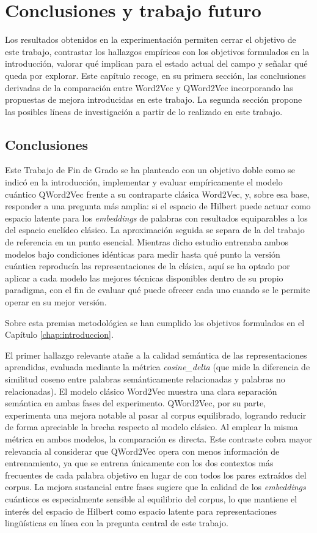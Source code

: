 \chapter{Conclusiones y trabajo futuro}
\label{chap:conclusiones}

Los resultados obtenidos en la experimentación permiten cerrar el objetivo de este trabajo, contrastar los hallazgos empíricos con los objetivos formulados en la introducción, valorar qué implican para el estado actual del campo y señalar qué queda por explorar. Este capítulo recoge, en su primera sección, las conclusiones derivadas de la comparación entre Word2Vec y QWord2Vec incorporando las propuestas de mejora introducidas en este trabajo. La segunda sección propone las posibles líneas de investigación a partir de lo realizado en este trabajo.

\section{Conclusiones}

Este Trabajo de Fin de Grado se ha planteado con un objetivo doble como se indicó en la introducción, implementar y evaluar empíricamente el modelo cuántico QWord2Vec frente a su contraparte clásica Word2Vec, y, sobre esa base, responder a una pregunta más amplia: si el espacio de Hilbert puede actuar como espacio latente para los \textit{embeddings} de palabras con resultados equiparables a los del espacio euclídeo clásico. La aproximación seguida se separa de la del trabajo de referencia \cite{ohno_qword2vec_2025} en un punto esencial. Mientras dicho estudio entrenaba ambos modelos bajo condiciones idénticas para medir hasta qué punto la versión cuántica reproducía las representaciones de la clásica, aquí se ha optado por aplicar a cada modelo las mejores técnicas disponibles dentro de su propio paradigma, con el fin de evaluar qué puede ofrecer cada uno cuando se le permite operar en su mejor versión.

Sobre esta premisa metodológica se han cumplido los objetivos formulados en el Capítulo \ref{chap:introduccion}.

El primer hallazgo relevante atañe a la calidad semántica de las representaciones aprendidas, evaluada mediante la métrica \textit{cosine\_delta} (que mide la diferencia de similitud coseno entre palabras semánticamente relacionadas y palabras no relacionadas). El modelo clásico Word2Vec muestra una clara separación semántica en ambas fases del experimento. QWord2Vec, por su parte, experimenta una mejora notable al pasar al corpus equilibrado, logrando reducir de forma apreciable la brecha respecto al modelo clásico. Al emplear la misma métrica en ambos modelos, la comparación es directa. Este contraste cobra mayor relevancia al considerar que QWord2Vec opera con menos información de entrenamiento, ya que se entrena únicamente con los dos contextos más frecuentes de cada palabra objetivo en lugar de con todos los pares extraídos del corpus. La mejora sustancial entre fases sugiere que la calidad de los \textit{embeddings} cuánticos es especialmente sensible al equilibrio del corpus, lo que mantiene el interés del espacio de Hilbert como espacio latente para representaciones lingüísticas en línea con la pregunta central de este trabajo.

